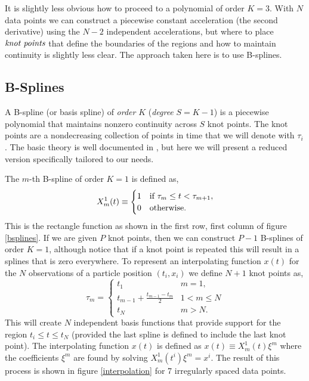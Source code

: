\documentclass[10pt,journal]{IEEEtran}
\begin{document}
It is slightly less obvious how to proceed to a polynomial of order $K=3$. With $N$ data points we can construct a piecewise constant acceleration (the second derivative) using the $N-2$ independent accelerations, but where to place $\emph{knot points}$ that define the boundaries of the regions and how to maintain continuity is slightly less clear. The approach taken here is to use B-splines.

\subsection{B-Splines}

A B-spline (or basis spline) of \emph{order} $K$ (\emph{degree} $S=K-1$) is a piecewise polynomial that maintains nonzero continuity across $S$ knot points. The knot points are a nondecreasing collection of points in time that we will denote with $\tau_i$. The basic theory is well documented in \cite{deboor1978-book}, but here we will present a reduced version specifically tailored to our needs.

The $m$-th B-spline of order $K=1$ is defined as,
\begin{equation}
X^1_m(t) \equiv \begin{cases}
1      & \text{if $ \tau_m \leq t < \tau_{m+1}$}, \\
0     & \text{otherwise}.
\end{cases}
\end{equation}
This is the rectangle function as shown in the first row, first column of figure \ref{bsplines}. If we are given $P$ knot points, then we can construct $P-1$ B-splines of order $K=1$, although notice that if a knot point is repeated this will result in a splines that is zero everywhere. To represent an interpolating function $x(t)$ for the $N$ observations of a particle position $(t_i,x_i)$ we define $N+1$ knot points as,
\begin{equation}
\tau_m = \begin{cases}
t_1      & \text{$m=1$}, \\
t_{m-1} + \frac{t_{m-1}-t_m}{2}	  & \text{$1<m \leq N$}\\
t_N     & \text{$m>N$}.
\end{cases}
\end{equation}
This will create $N$ independent basis functions that provide support for the region $t_i \leq t \leq t_N$ (provided the last spline is defined to include the last knot point). The interpolating function $x(t)$ is defined as $x(t) \equiv  X^1_m(t) \xi^m$ where the coefficients $\xi^m$ are found by solving $X^1_m(t^i) \xi^m = x^i$. The result of this process is shown in figure \ref{interpolation} for 7 irregularly spaced data points.
\end{document}
